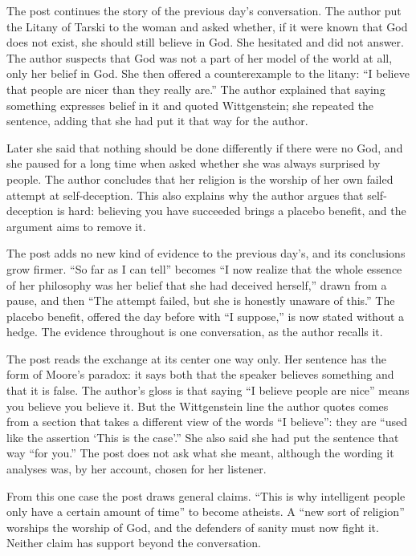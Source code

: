 \begin{afterword}
\summaryhead

The post continues the story of the previous day's conversation. The author put the Litany of Tarski to the woman and asked whether, if it were known that God does not exist, she should still believe in God. She hesitated and did not answer. The author suspects that God was not a part of her model of the world at all, only her belief in God. She then offered a counterexample to the litany: ``I believe that people are nicer than they really are.'' The author explained that saying something expresses belief in it and quoted Wittgenstein; she repeated the sentence, adding that she had put it that way for the author.

Later she said that nothing should be done differently if there were no God, and she paused for a long time when asked whether she was always surprised by people. The author concludes that her religion is the worship of her own failed attempt at self-deception. This also explains why the author argues that self-deception is hard: believing you have succeeded brings a placebo benefit, and the argument aims to remove it.

\responsehead

The post adds no new kind of evidence to the previous day's, and its conclusions grow firmer. ``So far as I can tell'' becomes ``I now realize that the whole essence of her philosophy was her belief that she had deceived herself,'' drawn from a pause, and then ``The attempt failed, but she is honestly unaware of this.'' The placebo benefit, offered the day before with ``I suppose,'' is now stated without a hedge. The evidence throughout is one conversation, as the author recalls it.

The post reads the exchange at its center one way only. Her sentence has the form of Moore's paradox: it says both that the speaker believes something and that it is false. The author's gloss is that saying ``I believe people are nice'' means you believe you believe it. But the Wittgenstein line the author quotes comes from a section that takes a different view of the words ``I believe'': they are ``used like the assertion `This is the case'.'' She also said she had put the sentence that way ``for you.'' The post does not ask what she meant, although the wording it analyses was, by her account, chosen for her listener.

From this one case the post draws general claims. ``This is why intelligent people only have a certain amount of time'' to become atheists. A ``new sort of religion'' worships the worship of God, and the defenders of sanity must now fight it. Neither claim has support beyond the conversation.


\end{afterword}
